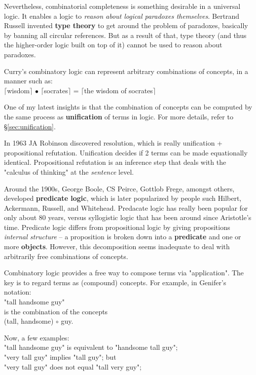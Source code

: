 Nevertheless, combinatorial completeness is something desirable in a universal logic.  It enables a logic to \textit{reason about logical paradoxes themselves}.  Bertrand Russell invented \textbf{type theory} to get around the problem of paradoxes, basically by banning all circular references.  But as a result of that, type theory (and thus the higher-order logic built on top of it) cannot be used to reason about paradoxes.

Curry's combinatory logic can represent arbitrary combinations of concepts, in a manner such as:\\
\tab $\lceil$wisdom$\rceil$ $\bullet$ $\lceil$socrates$\rceil$ = $\lceil$the wisdom of socrates$\rceil$

One of my latest insights is that the combination of concepts can be computed by the same process as \textbf{unification} of terms in logic.  For more details, refer to \S\ref{sec:unification}.

In 1963 JA Robinson discovered resolution, which is really unification + propositional refutation.  Unification decides if 2 terms can be made equationally identical.  Propositional refutation is an inference step that deals with the "calculus of thinking" at the \textit{sentence} level.

Around the 1900s, George Boole, CS Peirce, Gottlob Frege, amongst others, developed \textbf{predicate logic}, which is later popularized by people such Hilbert, Ackermann, Russell, and Whitehead.  Predacate logic has really been popular for only about 80 years, versus syllogistic logic that has been around since Aristotle's time.  Predicate logic differs from propositional logic by giving propositions \textit{internal structure} -- a proposition is broken down into a \textbf{predicate} and one or more \textbf{objects}.  However, this decomposition seems inadequate to deal with arbitrarily free combinations of concepts.

Combinatory logic provides a free way to compose terms via "application".  The key is to regard terms as (compound) concepts.  For example, in Genifer's notation:\\
\tab "tall handsome guy"\\
is the combination of the concepts\\
\tab (tall, handsome) $\circ$ guy.

Now, a few examples:\\
"tall handsome guy" is equivalent to "handsome tall guy";\\
"very tall guy" implies "tall guy";  but\\
"very tall guy" does not equal "tall very guy";

